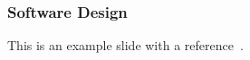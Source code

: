 \begin{frame}
	\frametitle{Software Design}
	This is an example slide with a reference~\cite{HeZeZuKrKo-FGMLN2020-Prediction-of-Mobile-Network-Connectivity}.
\end{frame}